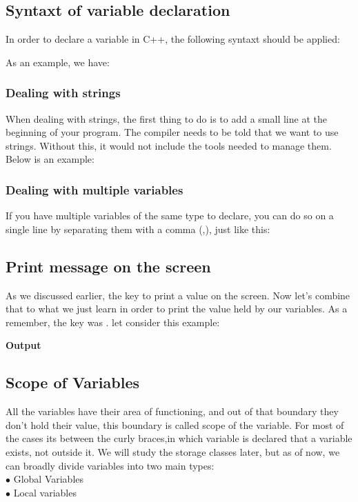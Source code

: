 \documentclass[11pt, a4paper]{article}
\begin{document}
\subsection{Syntaxt of variable declaration}
In order to declare a variable in C++, the following syntaxt should be applied:

As an example, we have:


\subsubsection{Dealing with strings}
When dealing with strings, the first thing to do is to add a small line at the beginning of your program.
The compiler needs to be told that we want to use strings. Without this, it
would not include the tools needed to manage them. Below is an example:


\subsubsection{Dealing with multiple variables}
If you have multiple variables of the same type to declare, you can do so on a single line
by separating them with a comma (,), just like this:


\subsection{Print message on the screen}
As we discussed earlier, the key to print a value on the screen. Now let's combine that to
what we just learn in order to print the value held by our variables. As a remember, the key
was . let consider this example:

\textbf{Output}


\subsection{Scope of Variables}
All the variables have their area of functioning, and out of that boundary they don't
hold their value, this boundary is called scope of the variable. For most of the
cases its between the curly braces,in which variable is declared that a variable
exists, not outside it. We will study the storage classes later, but as of now,
we can broadly divide variables into two main types:\\
$\bullet$ Global Variables\\
$\bullet$ Local variables
\end{document}
